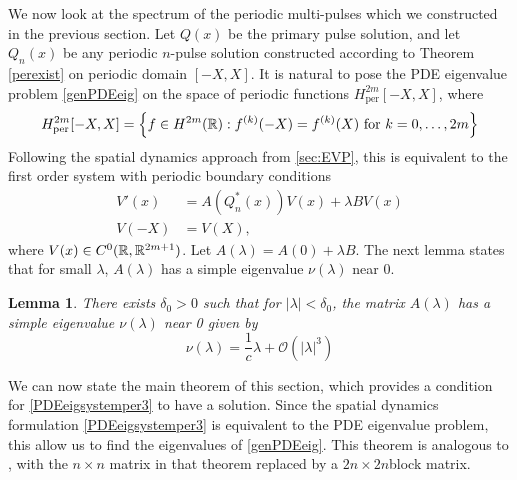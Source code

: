 \documentclass[11pt,reqno]{amsart}
\theoremstyle{plain}
\newtheorem{lemma}[theorem]{Lemma}
\theoremstyle{definition}
\theoremstyle{remark}
\begin{document}
We now look at the spectrum of the periodic multi-pulses which we constructed in the previous section. Let $Q(x)$ be the primary pulse solution, and let $Q_n(x)$ be any periodic $n$-pulse solution constructed according to Theorem \ref{perexist} on periodic domain $[-X, X]$. It is natural to pose the PDE eigenvalue problem \cref{genPDEeig} on the space of periodic functions $H^{2m}_{\text{per}}[-X,X]$, where
\[
H^{2m}_{\text{per}}[-X,X] = \left\{ f \in H^{2m}(\mathbb{R}) : f^{(k)}(-X) = f^{(k)}(X) \text{ for } k = 0, \dots, 2m \right\} 
\]
Following the spatial dynamics approach from \cref{sec:EVP}, this is equivalent to the first order system with periodic boundary conditions
\begin{equation}\label{PDEeigsystemper3}
\begin{aligned}
V'(x) &= A(Q_n^*(x))V(x) + \lambda B V(x) \\
V(-X) &= V(X),
\end{aligned}
\end{equation}
where $V(x) \in C^0(\mathbb{R},\mathbb{R}^{2m+1})$. Let $A(\lambda) = A(0) + \lambda B$. The next lemma states that for small $\lambda$, $A(\lambda)$ has a simple eigenvalue $\nu(\lambda)$ near 0.

\begin{lemma}\label{nulambdalemmasimple}
There exists $\delta_0 > 0$ such that for $|\lambda| < \delta_0$, the matrix $A(\lambda)$ has a simple eigenvalue $\nu(\lambda)$ near 0 given by
\begin{equation}\label{nulambda}
\nu(\lambda) = \frac{1}{c} \lambda + \mathcal{O}(|\lambda|^3)
\end{equation}
\end{lemma}

We can now state the main theorem of this section, which provides a condition for \cref{PDEeigsystemper3} to have a solution. Since the spatial dynamics formulation \cref{PDEeigsystemper3} is equivalent to the PDE eigenvalue problem, this allow us to find the eigenvalues of \cref{genPDEeig}. This theorem is analogous to \cite[Theorem 2]{Sandstede1998}, with the $n\times n$ matrix in that theorem replaced by a $2n\times 2n$block matrix.
\end{document}
